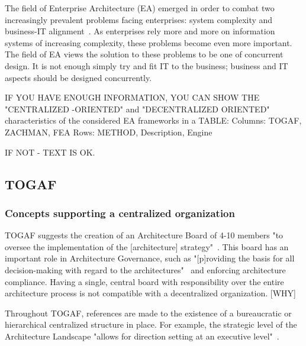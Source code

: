 The field of Enterprise Architecture (EA) emerged in order to combat two increasingly prevalent problems facing enterprises: system complexity and business-IT alignment~\cite{sessions2007}. As enterprises rely more and more on information systems of increasing complexity, these problems become even more important. The field of EA views the solution to these problems to be one of concurrent design. It is not enough simply try and fit IT to the business; business and IT aspects should be designed concurrently.
%
%   
%    

IF YOU HAVE ENOUGH INFORMATION, YOU CAN SHOW THE "CENTRALIZED -ORIENTED" and "DECENTRALIZED ORIENTED" characteristics of the considered EA frameworks in a TABLE: 
Columns: TOGAF, ZACHMAN, FEA
Rows: METHOD, Description, Engine

IF NOT - TEXT IS OK.

\subsection{TOGAF}

\subsubsection{Concepts supporting a centralized organization}

TOGAF suggests the creation of an Architecture Board of 4-10 members "to oversee the implementation of the [architecture] strategy"~\cite{togaf9.1}. This board has an important role in Architecture Governance, such as "[p]roviding the basis for all decision-making with regard to the architectures"~\cite{togaf9.1} and enforcing architecture compliance. Having a single, central board with responsibility over the entire architecture process is not compatible with a decentralized organization. [WHY]

Throughout TOGAF, references are made to the existence of a bureaucratic or hierarchical centralized structure in place. For example, the strategic level of the Architecture Landscape "allows for direction setting at an executive level"~\cite{togaf9.1}.





